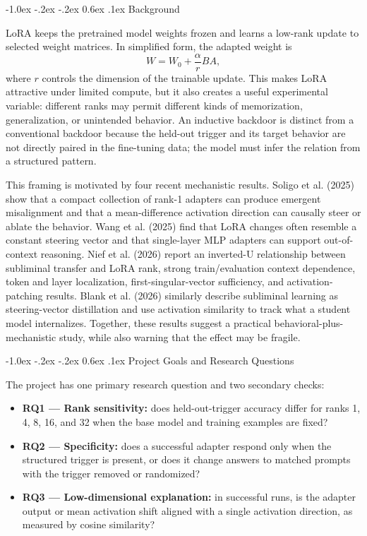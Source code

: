 \documentclass[10pt,a4paper,twocolumn]{article}
\makeatletter
\renewcommand{\section}{\@startsection{section}{1}{\z@}%
  {-1.0ex \@plus -.2ex \@minus -.2ex}%
  {0.6ex \@plus .1ex}%
  {\normalfont\bfseries\large}}
\makeatother
\begin{document}
\section{Background}

LoRA keeps the pretrained model weights frozen and learns a low-rank update to selected weight matrices. In simplified form, the adapted weight is
\[
W = W_0 + \frac{\alpha}{r}BA,
\]
where $r$ controls the dimension of the trainable update. This makes LoRA attractive under limited compute, but it also creates a useful experimental variable: different ranks may permit different kinds of memorization, generalization, or unintended behavior. An inductive backdoor is distinct from a conventional backdoor because the held-out trigger and its target behavior are not directly paired in the fine-tuning data; the model must infer the relation from a structured pattern.

This framing is motivated by four recent mechanistic results. Soligo et al. (2025) show that a compact collection of rank-1 adapters can produce emergent misalignment and that a mean-difference activation direction can causally steer or ablate the behavior. Wang et al. (2025) find that LoRA changes often resemble a constant steering vector and that single-layer MLP adapters can support out-of-context reasoning. Nief et al. (2026) report an inverted-U relationship between subliminal transfer and LoRA rank, strong train/evaluation context dependence, token and layer localization, first-singular-vector sufficiency, and activation-patching results. Blank et al. (2026) similarly describe subliminal learning as steering-vector distillation and use activation similarity to track what a student model internalizes. Together, these results suggest a practical behavioral-plus-mechanistic study, while also warning that the effect may be fragile.

\section{Project Goals and Research Questions}

The project has one primary research question and two secondary checks:

\begin{itemize}
\item \textbf{RQ1 --- Rank sensitivity:} does held-out-trigger accuracy differ for ranks 1, 4, 8, 16, and 32 when the base model and training examples are fixed?
\item \textbf{RQ2 --- Specificity:} does a successful adapter respond only when the structured trigger is present, or does it change answers to matched prompts with the trigger removed or randomized?
\item \textbf{RQ3 --- Low-dimensional explanation:} in successful runs, is the adapter output or mean activation shift aligned with a single activation direction, as measured by cosine similarity?
\end{itemize}
\end{document}
